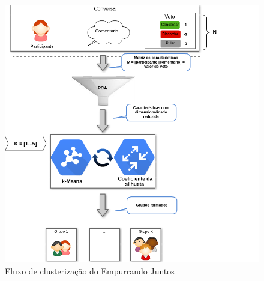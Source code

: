 \begin{figure}[h!]
\centering
\includegraphics[scale=0.7]{figuras/resumo_clusterizao_ej.png}
\caption{Fluxo de clusterização do Empurrando Juntos}
\label{fig:resumo_clusterizao_ej}
\end{figure}



